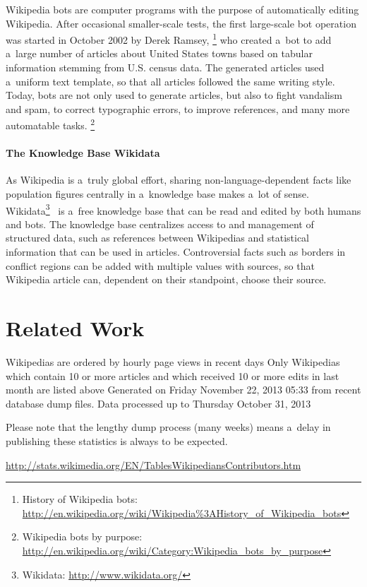 \documentclass{sig-alternate}
\newcommand{\inlinelistingsize}{\fontsize{8pt}{11pt}}
\let\oldurl\url
\renewcommand{\url}[1]{\inlinelistingsize\oldurl{#1}}
\begin{document}
Wikipedia bots are computer programs
with the purpose of automatically editing Wikipedia.
After occasional smaller-scale tests,
the first large-scale bot operation
was started in October 2002 by Derek Ramsey,%
\footnote{History of Wikipedia bots: \url{http://en.wikipedia.org/wiki/Wikipedia\%3AHistory_of_Wikipedia_bots}}
who created a~bot to add a~large number
of articles about United States towns
based on tabular information
stemming from U.S. census data.
The generated articles used a~uniform
text template, so that all articles
followed the same writing style.
Today, bots are not only used to generate articles,
but also to fight vandalism and spam,
to correct typographic errors,
to improve references, and many more automatable tasks.%
\footnote{Wikipedia bots by purpose: \url{http://en.wikipedia.org/wiki/Category:Wikipedia_bots_by_purpose}}

\paragraph{The Knowledge Base Wikidata}

As Wikipedia is a~truly global effort,
sharing non-language-dependent facts
like population figures centrally
in a~knowledge base makes a~lot of sense.
Wikidata\footnote{Wikidata: \url{http://www.wikidata.org/}}~\cite{vrandecic2012wikidata}
is a~free knowledge base that can be read
and edited by both humans and bots.
The knowledge base centralizes access to
and management of structured data,
such as references between Wikipedias
and statistical information that can be used in articles.
Controversial facts such as borders in conflict regions
can be added with multiple values with sources,
so that Wikipedia article can,
dependent on their standpoint, choose their source.

\section{Related Work}

Wikipedias are ordered by hourly page views in recent days
Only Wikipedias which contain 10 or more articles and which received 10 or more edits in last month are listed above
Generated on Friday November 22, 2013 05:33 from recent database dump files.
Data processed up to Thursday October 31, 2013

Please note that the lengthy dump process (many weeks) means a~delay in publishing these statistics is always to be expected.


\url{http://stats.wikimedia.org/EN/TablesWikipediansContributors.htm}
\end{document}
